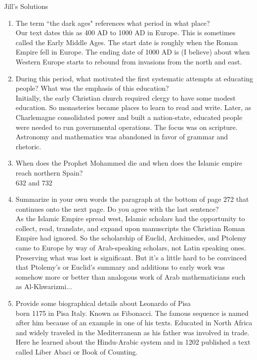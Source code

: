 \documentclass[12pt]{article}
\begin{document}
Jill's Solutions
\begin{enumerate}
\item The term ``the dark ages" references what period in what place?\\
Our text dates this as 400 AD to 1000 AD in Europe. This is sometimes called the Early Middle Ages. The start date is roughly when the Roman Empire fell in Europe. The ending date of 1000 AD is (I believe) about when Western Europe starts to rebound from invasions from the north and east.
\item During this period, what motivated the first systematic attempts at educating people? What was the emphasis of this education?\\
Initially,  the early Christian church required clergy to have some modest education. So monasteries became places to learn to read and write. Later, as Charlemagne consolidated power and built a nation-state, educated people were needed to run governmental operations. The focus was on scripture. Astronomy and mathematics was abandoned in favor of grammar and rhetoric.
\item When does the Prophet Mohammed die and when does the Islamic empire reach northern Spain?\\
632 and 732
 \item Summarize in your own words the paragraph at the bottom of page 272 that continues onto the next page. Do you agree with the last sentence?\\
As the Islamic Empire spread west, Islamic scholars had the opportunity to collect, read, translate, and expand upon manuscripts the Christian Roman Empire had ignored. So the scholarship of Euclid, Archimedes, and Ptolemy came to Europe by way of Arab-speaking scholars, not Latin speaking ones. Preserving what was lost is significant. But it's a little hard to be convinced that Ptolemy's or Euclid's summary and additions to early work was somehow more or better than analogous work of Arab mathematicians such as Al-Khwarizmi...
\item Provide some biographical details about Leonardo of Pisa\\
born 1175 in Pisa Italy. Known as Fibonacci. The famous sequence is named after him because of an example in one of his texts. Educated in North Africa and widely traveled in the Mediterranean as his father was involved in trade. Here he learned about the Hindu-Arabic system and in 1202 published a text called Liber Abaci or Book of Counting.
 \end{enumerate}
\end{document}
